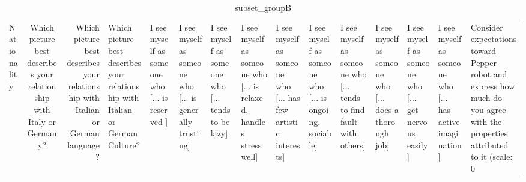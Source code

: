 \begin{table}
\caption{subset_groupB}
\label{tab:subset_groupB}
\begin{tabular}{lcr}
\toprule
Nationality & Which picture best describes your relationship with Italy or Germany? & Which picture best describes your relationship with Italian or German language? & Which picture best describes your relationship with Italian or German Culture? & I see myself as someone who  [... is reserved ] & I see myself as someone who  [... is generally trusting] & I see myself as someone who  [... tends to be lazy] & I see myself as someone who  [... is relaxed, handles stress well] & I see myself as someone who  [... has few artistic interests] & I see myself as someone who  [... is ongoing, sociable] & I see myself as someone who  [... tends to find fault with others] & I see myself as someone who  [... does a thorough job] & I see myself as someone who  [... get nervous easily] & I see myself as someone who  [... has active imagination] & Consider expectations toward Pepper robot and express how much do you agree with the properties attributed to it (scale: 0%
\end{tabular}
\end{table}

